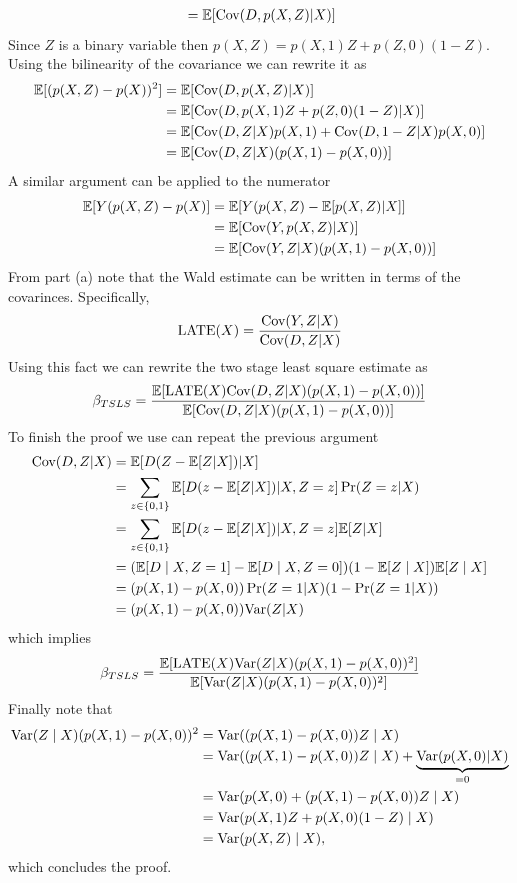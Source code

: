 \documentclass{article}
\begin{document}
\begin{solution}
\begin{align*}
    &= \mathbb{E}[\text{Cov}(D,p(X,Z)\vert X)] \\ 
\end{align*}
Since $Z$ is a binary variable then $p(X,Z)=p(X,1)Z+p(Z,0)(1-Z)$. Using the bilinearity of the covariance we can rewrite it as 
\begin{align*}
    \mathbb{E}[(p(X,Z) - p(X))^2] &= \mathbb{E}[\text{Cov}(D,p(X,Z)\vert X)] \\ 
    &= \mathbb{E}[\text{Cov}(D,p(X,1)Z+p(Z,0)(1-Z)\vert X)] \\  
    &= \mathbb{E}[\text{Cov}(D,Z\vert X)p(X,1) + \text{Cov}(D,1-Z\vert X)p(X,0)] \\ 
    &= \mathbb{E}[\text{Cov}(D,Z\vert X)(p(X,1)-p(X,0))]
\end{align*}
A similar argument can be applied to the numerator
\begin{align*}
    \mathbb{E}[Y(p(X,Z) - p(X)] &= \mathbb{E}[Y(p(X,Z)-\mathbb{E}[p(X,Z)\vert X]] \\ 
    &= \mathbb{E}[\text{Cov}(Y,p(X,Z)\vert X)] \\ 
    &= \mathbb{E}[\text{Cov}(Y,Z\vert X)(p(X,1)-p(X,0))]
\end{align*}
From part (a) note that the Wald estimate can be written in terms of the covarinces. Specifically, 
\begin{equation*}
    \text{LATE}(X) = \frac{\text{Cov}(Y,Z\vert X)}{\text{Cov}(D,Z\vert X)}
\end{equation*}
Using this fact we can rewrite the two stage least square estimate as 
\begin{equation*}
    \beta_{TSLS} = \frac{\mathbb{E}[\text{LATE}(X)\text{Cov}(D,Z\vert X)(p(X,1)-p(X,0))]}{\mathbb{E}[\text{Cov}(D,Z\vert X)(p(X,1)-p(X,0))]}
\end{equation*}
To finish the proof we use can repeat the previous argument 
\begin{align*}
   \text{Cov}(D,Z\vert X) &= \mathbb{E}[D(Z-\mathbb{E}[Z\vert X])\vert X] \\ 
   &= \sum_{z\in\{0,1\}}\mathbb{E}[D(z-\mathbb{E}[Z\vert X])\vert X,Z=z]\Pr(Z=z\vert X) \\
   &= \sum_{z\in\{0,1\}}\mathbb{E}[D(z-\mathbb{E}[Z\vert X])\vert X,Z=z]\mathbb{E}[Z\vert X] \\
   &=(\mathbb{E}[D \mid X, Z=1]-\mathbb{E}[D \mid X, Z=0])(1-\mathbb{E}[Z \mid X]) \mathbb{E}[Z \mid X] \\ 
   &= (p(X,1)-p(X,0))\Pr(Z=1\vert X)(1-\Pr(Z=1\vert X))
   \\ 
   &= (p(X,1)-p(X,0))\text{Var}(Z\vert X)
\end{align*}
which implies 
\begin{equation*}
    \beta_{TSLS} = \frac{\mathbb{E}[\text{LATE}(X)\text{Var}(Z\vert X)(p(X,1)-p(X,0))^2]}{\mathbb{E}[\text{Var}(Z\vert X)(p(X,1)-p(X,0))^2]}
\end{equation*}
Finally note that 
\begin{align*}
\text{Var}(Z \mid X) (p(X, 1)-p(X, 0))^{2} &=\text{Var}((p(X, 1)-p(X, 0)) Z \mid X) \\
&= \text{Var}((p(X, 1)-p(X, 0)) Z \mid X) +\underbrace{\text{Var}(p(X,0)\vert X)}_{=0} \\ 
&=\text{Var}(p(X, 0)+(p(X, 1)-p(X, 0)) Z \mid X)\\
&=\text{Var}(p(X, 1) Z+p(X, 0)(1-Z) \mid X) \\
&=\text{Var}(p(X, Z) \mid X),
\end{align*}
which concludes the proof. 
\end{solution}
\end{document}
